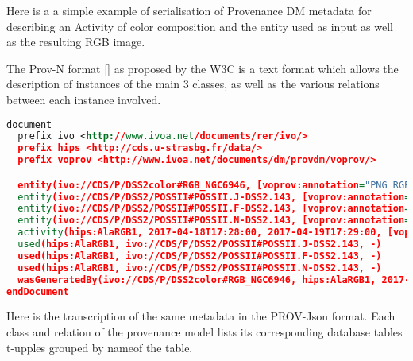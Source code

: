
Here is a a simple example of serialisation of Provenance DM metadata for describing an Activity of color composition and the entity used as input as well as the resulting RGB image. 

The Prov-N format \ref{} as proposed by the W3C is a text format which allows the description of instances of the main 3 classes, as well as the various relations between each instance involved.

\begin{lstlisting}[language=XML, caption= PROV-N serialisation example for a Color composition Activity]
document
  prefix ivo <http://www.ivoa.net/documents/rer/ivo/>
  prefix hips <http://cds.u-strasbg.fr/data/>
  prefix voprov <http://www.ivoa.net/documents/dm/provdm/voprov/>

  entity(ivo://CDS/P/DSS2color#RGB_NGC6946, [voprov:annotation="PNG RGB image built from DSS2 with Aladin for galaxy NGC 6946", voprov:doculink="http://cds.u-strasbg.fr/aladin.gml", voprov:name="RGB DSS2 image for NGC 6946"])
  entity(ivo://CDS/P/DSS2/POSSII#POSSII.J-DSS2.143, [voprov:annotation=" DSS2 digitization of the Blue POSSII Schmidt survey around  NGC 6946", voprov:doculink="http://cds.u-strasbg.fr/aladin.gm", voprov:name="POSSII Blue Survey DSS2 NGC6946"])
  entity(ivo://CDS/P/DSS2/POSSII#POSSII.F-DSS2.143, [voprov:annotation=" DSS2 digitization of the Red POSSII Schmidt survey around NGC 6946", voprov:doculink="http://cds.u-strasbg.fr/aladin.gml", voprov:name="POSSII Red Survey DSS2 NGC6946"])
  entity(ivo://CDS/P/DSS2/POSSII#POSSII.N-DSS2.143, [voprov:annotation=" DSS2 digitization of the Infra red POSSII Schmidt survey around NGC 6946", voprov:doculink="http://cds.u-strasbg.fr/aladin.gm", voprov:name="POSSII Infra Red Survey DSS2 NGC6946"])
  activity(hips:AlaRGB1, 2017-04-18T17:28:00, 2017-04-19T17:29:00, [voprov:desc_id="AlaRGB", voprov:desc_type="RGBencoding", voprov:annotation="Aladin RGB image generation for NGC 6946", voprov:desc_name="Aladin RGB image generation algorithm", voprov:name="Aladin RGB 1", voprov:desc_doculink="http://cds.u-strasbg.fr/aladin.gml"])
  used(hips:AlaRGB1, ivo://CDS/P/DSS2/POSSII#POSSII.J-DSS2.143, -)
  used(hips:AlaRGB1, ivo://CDS/P/DSS2/POSSII#POSSII.F-DSS2.143, -)
  used(hips:AlaRGB1, ivo://CDS/P/DSS2/POSSII#POSSII.N-DSS2.143, -)
  wasGeneratedBy(ivo://CDS/P/DSS2color#RGB_NGC6946, hips:AlaRGB1, 2017-05-05T00:00:00)
endDocument
\end{lstlisting}
\newpage

Here is the transcription of the same metadata in the PROV-Json format. 
Each class and relation of the provenance model lists its corresponding database tables t-upples grouped by nameof the table. 

